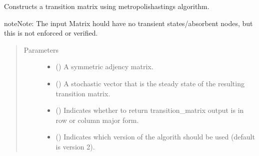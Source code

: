 \documentclass[letterpaper,10pt,english]{sphinxmanual}
\begin{document}

\begin{fulllineitems}
\label{\detokenize{app.domain.helpers:app.domain.helpers.matrices._metropolis_hastings}}
Constructs a transition matrix using metropolis\sphinxhyphen{}hastings algorithm.

\begin{sphinxadmonition}{note}{Note:}
The input Matrix hould have no transient states/absorbent nodes,
but this is not enforced or verified.
\end{sphinxadmonition}
\begin{quote}\begin{description}
\item[{Parameters}] \leavevmode\begin{itemize}
\item {} 
 () \textendash{} A symmetric adjency matrix.

\item {} 
 () \textendash{} A stochastic vector that is the steady state of the resulting
transition matrix.

\item {} 
 () \textendash{} Indicates whether to return transition\_matrix output
is in row or column major form.

\item {} 
 () \textendash{} Indicates which version of the algorith should be used
(default is version 2).


\end{itemize}
\end{description}
\end{quote}
\end{fulllineitems}
\end{document}

